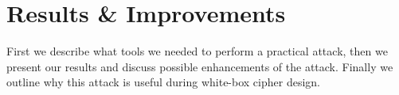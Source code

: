 \chapter{Results \& Improvements}
\label{chap:results}

First we describe what tools we needed to perform a practical attack, then we present our results and discuss possible enhancements of the attack. Finally we outline why this attack is useful during white-box cipher design.







